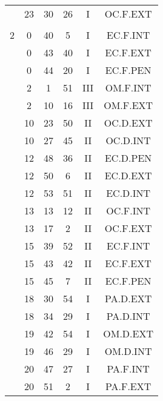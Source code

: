 \documentclass[12pt, a4paper]{article}
\begin{document}
\begin{multicols}{3}
{\begin{tabular}{c c c c c c}
	 	 	 	 & 23 & 30 & 26 & I & OC.F.EXT\\%
	 	 	 	 & & & & & \\%
	 	 	 	2 & 0 & 40 & 5 & I & EC.F.INT\\%
	 	 	 	 & 0 & 43 & 40 & I & EC.F.EXT\\%
	 	 	 	 & 0 & 44 & 20 & I & EC.F.PEN\\%
	 	 	 	 & 2 & 1 & 51 & III & OM.F.INT\\%
	 	 	 	 & 2 & 10 & 16 & III & OM.F.EXT\\%
	 	 	 	 & 10 & 23 & 50 & II & OC.D.EXT\\%
	 	 	 	 & 10 & 27 & 45 & II & OC.D.INT\\%
	 	 	 	 & 12 & 48 & 36 & II & EC.D.PEN\\%
	 	 	 	 & 12 & 50 & 6 & II & EC.D.EXT\\%
	 	 	 	 & 12 & 53 & 51 & II & EC.D.INT\\%
	 	 	 	 & 13 & 13 & 12 & II & OC.F.INT\\%
	 	 	 	 & 13 & 17 & 2 & II & OC.F.EXT\\%
	 	 	 	 & 15 & 39 & 52 & II & EC.F.INT\\%
	 	 	 	 & 15 & 43 & 42 & II & EC.F.EXT\\%
	 	 	 	 & 15 & 45 & 7 & II & EC.F.PEN\\%
	 	 	 	 & 18 & 30 & 54 & I & PA.D.EXT\\%
	 	 	 	 & 18 & 34 & 29 & I & PA.D.INT\\%
	 	 	 	 & 19 & 42 & 54 & I & OM.D.EXT\\%
	 	 	 	 & 19 & 46 & 29 & I & OM.D.INT\\%
	 	 	 	 & 20 & 47 & 27 & I & PA.F.INT\\%
	 	 	 	 & 20 & 51 & 2 & I & PA.F.EXT\\%

\end{tabular}}
\end{multicols}
\end{document}
